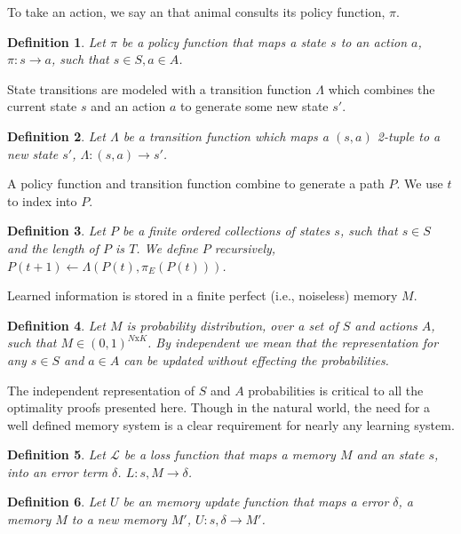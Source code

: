 \documentclass[9pt,twocolumn,twoside]{pnas-new}
\newtheorem{definition}{Definition}
\begin{document}
To take an action, we say an that animal consults its policy function, $\pi$. 

\begin{definition}
    Let $\pi$ be a policy function that maps a state $s$ to an action $a$, $\pi : s \rightarrow a$, such that $s \in S, a \in A$.
\end{definition}

State transitions are modeled with a transition function $\Lambda$ which combines the current state $s$ and an action $a$ to generate some new state $s'$.

\begin{definition}
    Let $\Lambda$ be a transition function which maps a $(s,a)$ 2-tuple to a new state $s'$, $\Lambda : (s, a) \rightarrow s'$.     
\end{definition}

A policy function and transition function combine to generate a path $P$. We use $t$ to index into $P$. 

\begin{definition}
    Let $P$ be a finite ordered collections of states $s$, such that $s \in S$ and the length of $P$ is $T$. We define $P$ recursively, $P(t+1) \leftarrow \Lambda(P(t), \pi_E(P(t)))$.
\end{definition}

Learned information is stored in a finite perfect (i.e., noiseless) memory $M$. 
    
\begin{definition}
    Let $M$ is probability distribution, over a set of $S$ and actions $A$, such that $M \in (0, 1)^{N\text{x}K}$. By independent we mean that the representation for any $s \in S$ and $a \in A$ can be updated without effecting the probabilities. 
\end{definition}

The independent representation of $S$ and $A$ probabilities is critical to all the optimality proofs presented here. Though in the natural world, the need for a well defined memory system is a clear requirement for nearly any learning system.

\begin{definition}
    Let $\mathcal{L}$ be a loss function that maps a memory $M$ and an state $s$, into an error term $\delta$. $L : s, M \rightarrow \delta$.
\end{definition}

\begin{definition}
    Let $U$ be an memory update function that maps a error $\delta$, a memory $M$ to a new memory $M'$, $U : s, \delta \rightarrow M'$.
\end{definition}
\end{document}
